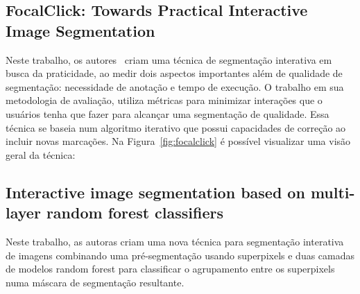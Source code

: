 \subsection{FocalClick: Towards Practical Interactive Image Segmentation}\label{sec:focalclick}

Neste trabalho, os autores~\cite{chen2022focalclick} criam uma técnica de
segmentação interativa em busca da praticidade, ao medir dois aspectos
importantes além de qualidade de segmentação: necessidade de anotação
e tempo de execução. O trabalho em sua metodologia de avaliação,
utiliza métricas para minimizar interações que o usuários tenha que
fazer para alcançar uma segmentação de qualidade. Essa técnica se
baseia num algoritmo iterativo que possui capacidades de correção ao
incluir novas marcações. Na Figura~\ref{fig:focalclick} é possível visualizar uma
visão geral da técnica:


\begin{figure}[!h]
        \captionsetup{width=12cm}
		\centering
\end{figure}


\subsection{Interactive image segmentation based on multi-layer
random forest classifiers}\label{sec:superpixel-random-forest}

Neste trabalho, as autoras\cite{shan2023interactive} criam uma nova
técnica para segmentação interativa de imagens combinando uma
pré-segmentação usando superpixels e duas camadas de modelos random
forest para classificar o agrupamento entre os superpixels numa
máscara de segmentação resultante.


